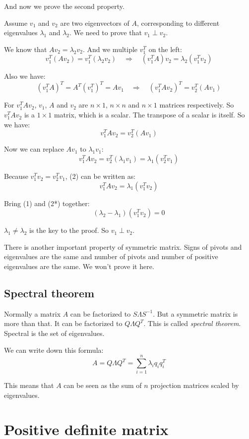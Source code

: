 \documentclass[10pt,a4paper,oneside,numbers=noenddot]{scrbook}
\theoremstyle{ctplain}
\theoremstyle{ctresult}
\begin{document}
And now we prove the second property.

Assume $v_1$ and $v_2$ are two eigenvectors of $A$, corresponding to different eigenvalues
$\lambda_1$ and $\lambda_2$. We need to prove that $v_1 \perp v_2$.

We know that $A v_2 = \lambda_2 v_2$. And we multiple $v_1^{T}$ on the left:
\[
  v_1^{T} (A v_2) = v_1^{T} (\lambda_2 v_2) \quad \Rightarrow \quad
  (v_1^T A) v_2 = \lambda_2 (v_1^T v_2) \tag{1}
\]

Also we have:
\[
  (v_1^{T} A)^{T} = A^{T} (v_1^{T})^{T} = A v_1 \quad \Rightarrow \quad
  (v_1^T A v_2)^{T} = v_2^{T} (A v_1)
\]

For $v_1^T A v_2$, $v_1$, $A$ and $v_2$ are $n \times 1$, $n \times n$ and $n \times 1$
matrices respectively. So $v_1^T A v_2$ is a $1 \times 1$ matrix, which is a scalar.
The transpose of a scalar is itself. So we have:
\[
  v_1^T A v_2 = v_2^{T} (A v_1)
\]

Now we can replace $A v_1$ to $\lambda_1 v_1$:
\[
  v_1^T A v_2 = v_2^{T} (\lambda_1 v_1) = \lambda_1 (v_2^{T} v_1) \tag{2}
\]

Because $v_1^{T} v_2 = v_2^{T} v_1$, (2) can be written as:
\[
  v_1^T A v_2 = \lambda_1 (v_1^{T} v_2) \tag{2*}
\]

Bring (1) and (2*) together:
\[
  (\lambda_2 - \lambda_1) (v_1^T v_2) = 0
\]

$\lambda_1 \neq \lambda_2$ is the key to the proof. So $v_1 \perp v_2$.

There is another important property of symmetric matrix. Signs of pivots and eigenvalues
are the same and number of pivots and number of positive eigenvalues are the same. We
won't prove it here.

\subsection{Spectral theorem}

Normally a matrix $A$ can be factorized to $S\Lambda S^{-1}$. But a symmetric matrix is
more than that. It can be factorized to $Q\Lambda Q^{T}$. This is called \emph{spectral
theorem}. Spectral is the set of eigenvalues.

We can write down this formula:
\[
  A = Q\Lambda Q^{T} = \sum_{i=1}^{n} \lambda_i q_i q_i^{T}
\]

This means that $A$ can be seen as the sum of $n$ projection matrices scaled by
eigenvalues.

\section{Positive definite matrix}
\end{document}
